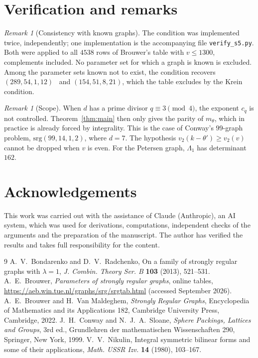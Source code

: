 \documentclass[11pt]{amsart}
\theoremstyle{remark}
\newtheorem{remark}[theorem]{Remark}
\begin{document}
\section{Verification and remarks}
\begin{remark}[Consistency with known graphs]
The condition was implemented twice, independently; one implementation is the accompanying file
\texttt{verify\_s5.py}. Both were applied to all $4538$ rows of Brouwer's table with $v\le1300$, complements included. No parameter set
for which a graph is known is excluded. Among the parameter sets known not to exist, the condition recovers
$(289,54,1,12)$~\cite{BR} and $(154,51,8,21)$, which the table excludes by the Krein condition.
\end{remark}

\begin{remark}[Scope]
When $d$ has a prime divisor $q\equiv3\pmod4$, the exponent $c_q$ is not controlled. Theorem~\ref{thm:main} then only
gives the parity of $m_\theta$, which in practice is already forced by integrality. This is the case of Conway's
$99$-graph problem, $\mathrm{srg}(99,14,1,2)$, where $d=7$. The hypothesis $v_2(k-\theta')\ge v_2(v)$ cannot be dropped
when $v$ is even. For the Petersen graph, $\Lambda_1$ has determinant $162$.
\end{remark}

\section*{Acknowledgements}
This work was carried out with the assistance of Claude (Anthropic), an AI system, which was used for derivations, computations, independent checks of the arguments and the preparation of the manuscript. The author has verified the results and takes full responsibility for the content.

\begin{thebibliography}{9}
 A.~V.~Bondarenko and D.~V.~Radchenko, On a family of strongly regular graphs with $\lambda=1$,
\emph{J. Combin. Theory Ser. B} \textbf{103} (2013), 521--531.
 A.~E.~Brouwer, \emph{Parameters of strongly regular graphs}, online tables,
\url{https://aeb.win.tue.nl/graphs/srg/srgtab.html} (accessed September 2026).
 A.~E.~Brouwer and H.~Van Maldeghem, \emph{Strongly Regular Graphs}, Encyclopedia of Mathematics and its
Applications 182, Cambridge University Press, Cambridge, 2022.
 J.~H.~Conway and N.~J.~A.~Sloane, \emph{Sphere Packings, Lattices and Groups}, 3rd ed., Grundlehren der
mathematischen Wissenschaften 290, Springer, New York, 1999.
 V.~V.~Nikulin, Integral symmetric bilinear forms and some of their applications,
\emph{Math. USSR Izv.} \textbf{14} (1980), 103--167.
\end{thebibliography}
\end{document}
